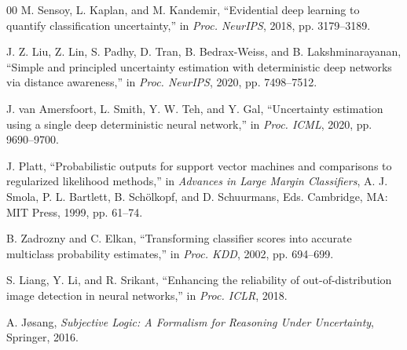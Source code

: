 \documentclass[conference]{IEEEtran}
\begin{document}
\begin{thebibliography}{00}
 M. Sensoy, L. Kaplan, and M. Kandemir, ``Evidential deep learning to quantify classification uncertainty,'' in \emph{Proc. NeurIPS}, 2018, pp. 3179--3189.

 J. Z. Liu, Z. Lin, S. Padhy, D. Tran, B. Bedrax-Weiss, and B. Lakshminarayanan, ``Simple and principled uncertainty estimation with deterministic deep networks via distance awareness,'' in \emph{Proc. NeurIPS}, 2020, pp. 7498--7512.

 J. van Amersfoort, L. Smith, Y. W. Teh, and Y. Gal, ``Uncertainty estimation using a single deep deterministic neural network,'' in \emph{Proc. ICML}, 2020, pp. 9690--9700.

 J. Platt, ``Probabilistic outputs for support vector machines and comparisons to regularized likelihood methods,'' in \emph{Advances in Large Margin Classifiers}, A. J. Smola, P. L. Bartlett, B. Sch\"{o}lkopf, and D. Schuurmans, Eds. Cambridge, MA: MIT Press, 1999, pp. 61--74.

 B. Zadrozny and C. Elkan, ``Transforming classifier scores into accurate multiclass probability estimates,'' in \emph{Proc. KDD}, 2002, pp. 694--699.

 S. Liang, Y. Li, and R. Srikant, ``Enhancing the reliability of out-of-distribution image detection in neural networks,'' in \emph{Proc. ICLR}, 2018.

 A. J{\o}sang, \emph{Subjective Logic: A Formalism for Reasoning Under Uncertainty}, Springer, 2016.

\end{thebibliography}
\end{document}
